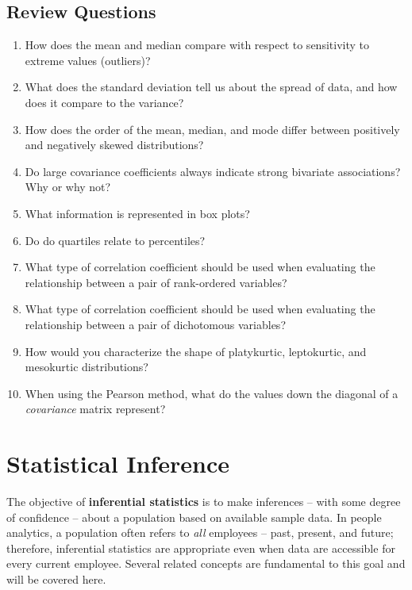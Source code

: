 \documentclass[
]{book}
\begin{document}
\hypertarget{review-questions-5}{%
\section{Review Questions}\label{review-questions-5}}

\begin{enumerate}
\def\labelenumi{\arabic{enumi}.}
\item
  How does the mean and median compare with respect to sensitivity to extreme values (outliers)?
\item
  What does the standard deviation tell us about the spread of data, and how does it compare to the variance?
\item
  How does the order of the mean, median, and mode differ between positively and negatively skewed distributions?
\item
  Do large covariance coefficients always indicate strong bivariate associations? Why or why not?
\item
  What information is represented in box plots?
\item
  Do do quartiles relate to percentiles?
\item
  What type of correlation coefficient should be used when evaluating the relationship between a pair of rank-ordered variables?
\item
  What type of correlation coefficient should be used when evaluating the relationship between a pair of dichotomous variables?
\item
  How would you characterize the shape of platykurtic, leptokurtic, and mesokurtic distributions?
\item
  When using the Pearson method, what do the values down the diagonal of a \emph{covariance} matrix represent?
\end{enumerate}

\hypertarget{inf-stats}{%
\chapter{Statistical Inference}\label{inf-stats}}

The objective of \textbf{inferential statistics} is to make inferences -- with some degree of confidence -- about a population based on available sample data. In people analytics, a population often refers to \emph{all} employees -- past, present, and future; therefore, inferential statistics are appropriate even when data are accessible for every current employee. Several related concepts are fundamental to this goal and will be covered here.
\end{document}
